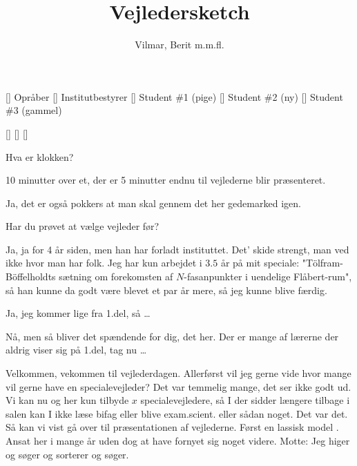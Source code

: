 \documentclass[a4paper,11pt]{article}
\title{Vejledersketch}
\author{Vilmar, Berit m.m.fl.}
\begin{document}
\maketitle

\begin{roles}
[] Opråber
[] Institutbestyrer
[] Student \#1 (pige)
[] Student \#2 (ny)
[] Student \#3 (gammel)
\end{roles}

\begin{props}
[]
[]
[]
\end{props}


\begin{sketch}


 Hva er klokken?

  10 minutter over et, der er 5 minutter endnu til vejlederne blir præsenteret.

 Ja, det er også pokkers at man skal gennem det her gedemarked igen.

 Har du prøvet at vælge vejleder før?

 Ja, ja for 4 år siden, men han har forladt instituttet. Det' skide strengt, man ved ikke hvor man har folk.
          Jeg har kun arbejdet i $3.5$ år på mit speciale: "Tölfram-Böffelholdts sætning om forekomsten af $N$-fasanpunkter
          i uendelige Flåbert-rum", så han kunne da godt være blevet et par år mere, så jeg kunne blive færdig.

 Ja, jeg kommer lige fra 1.del, så \ldots

  Nå, men så bliver det spændende for dig, det her. Der er mange af lærerne
          der aldrig viser sig på 1.del, tag nu \ldots

  Velkommen, vekommen til vejlederdagen. Allerførst vil jeg gerne vide 
         hvor mange vil gerne have en specialevejleder?  Det var temmelig mange, det ser ikke
         godt ud. Vi kan nu og her kun tilbyde $x$ specialevejledere, så I der sidder længere tilbage i salen kan I
         ikke læse bifag eller blive exam.scient. eller sådan noget.  Det var det.
         Så kan vi vist gå over til præsentationen af vejlederne. Først en lassisk model . Ansat her i mange år uden dog
         at have fornyet sig noget videre. Motte: Jeg higer og søger og sorterer og søger.


\end{sketch}
\end{document}
